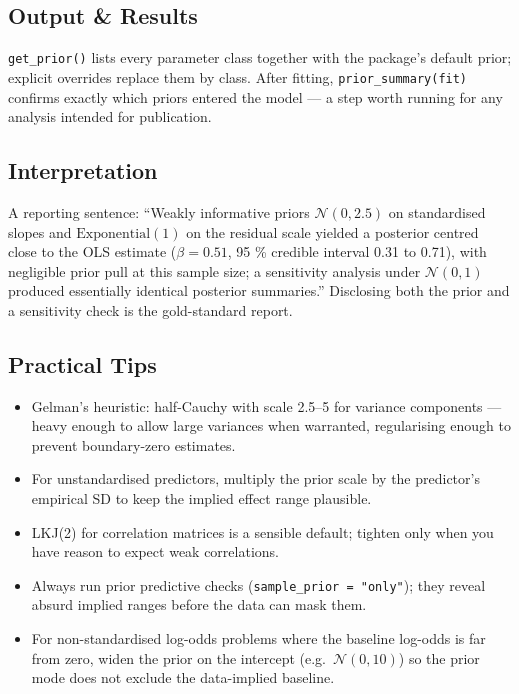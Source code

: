 \documentclass[
]{article}
\providecommand{\tightlist}{%
  \setlength{\itemsep}{0pt}\setlength{\parskip}{0pt}}
\begin{document}
\subsection{Output \& Results}\label{output-results}

\texttt{get\_prior()} lists every parameter class together with the
package's default prior; explicit overrides replace them by class. After
fitting, \texttt{prior\_summary(fit)} confirms exactly which priors
entered the model --- a step worth running for any analysis intended for
publication.

\subsection{Interpretation}\label{interpretation}

A reporting sentence: ``Weakly informative priors \(\mathcal N(0, 2.5)\)
on standardised slopes and \(\mathrm{Exponential}(1)\) on the residual
scale yielded a posterior centred close to the OLS estimate
(\(\beta = 0.51\), 95 \% credible interval 0.31 to 0.71), with
negligible prior pull at this sample size; a sensitivity analysis under
\(\mathcal N(0, 1)\) produced essentially identical posterior
summaries.'' Disclosing both the prior and a sensitivity check is the
gold-standard report.

\subsection{Practical Tips}\label{practical-tips}

\begin{itemize}
\tightlist
\item
  Gelman's heuristic: half-Cauchy with scale 2.5--5 for variance
  components --- heavy enough to allow large variances when warranted,
  regularising enough to prevent boundary-zero estimates.
\item
  For unstandardised predictors, multiply the prior scale by the
  predictor's empirical SD to keep the implied effect range plausible.
\item
  LKJ(2) for correlation matrices is a sensible default; tighten only
  when you have reason to expect weak correlations.
\item
  Always run prior predictive checks
  (\texttt{sample\_prior\ =\ "only"}); they reveal absurd implied ranges
  before the data can mask them.
\item
  For non-standardised log-odds problems where the baseline log-odds is
  far from zero, widen the prior on the intercept
  (e.g.~\(\mathcal N(0, 10)\)) so the prior mode does not exclude the
  data-implied baseline.
\end{itemize}
\end{document}
